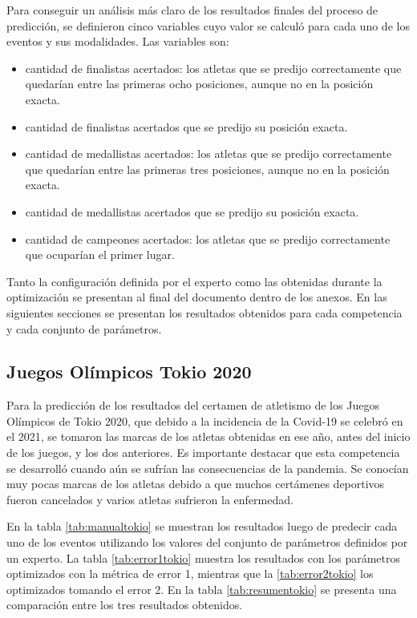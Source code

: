 Para conseguir un análisis más claro de los resultados finales del proceso de predicción, se definieron cinco variables cuyo valor se calculó para cada uno de los eventos y sus modalidades. Las variables son:

\begin{itemize}
    \item cantidad de finalistas acertados: los atletas que se predijo correctamente que quedarían entre las primeras ocho posiciones, aunque no en la posición exacta.
    \item cantidad de finalistas acertados que se predijo su posición exacta.
    \item cantidad de medallistas acertados: los atletas que se predijo correctamente que quedarían entre las primeras tres posiciones, aunque no en la posición exacta.
    \item cantidad de medallistas acertados que se predijo su posición exacta.
    \item cantidad de campeones acertados: los atletas que se predijo correctamente que ocuparían el primer lugar.
\end{itemize}
    
Tanto la configuración definida por el experto como las obtenidas durante la optimización se presentan al final del documento dentro de los anexos. En las siguientes secciones se presentan los resultados obtenidos para cada competencia y cada conjunto de parámetros.

\subsection{Juegos Olímpicos Tokio 2020}

Para la predicción de los resultados del certamen de atletismo de los Juegos Olímpicos de Tokio 2020, que debido a la incidencia de la Covid-19 se celebró en el 2021, se tomaron las marcas de los atletas obtenidas en ese año, antes del inicio de los juegos, y los dos anteriores. Es importante destacar que esta competencia se desarrolló cuando aún se sufrían las consecuencias de la pandemia. Se conocían muy pocas marcas de los atletas debido a que muchos certámenes deportivos fueron cancelados y varios atletas sufrieron la enfermedad.

En la tabla \ref{tab:manualtokio} se muestran los resultados luego de predecir cada uno de los eventos utilizando los valores del conjunto de parámetros definidos por un experto. La tabla \ref{tab:error1tokio} muestra los resultados con los parámetros optimizados con la métrica de error 1, mientras que la \ref{tab:error2tokio} los optimizados tomando el error 2. En la tabla \ref{tab:resumentokio} se presenta una comparación entre los tres resultados obtenidos.

